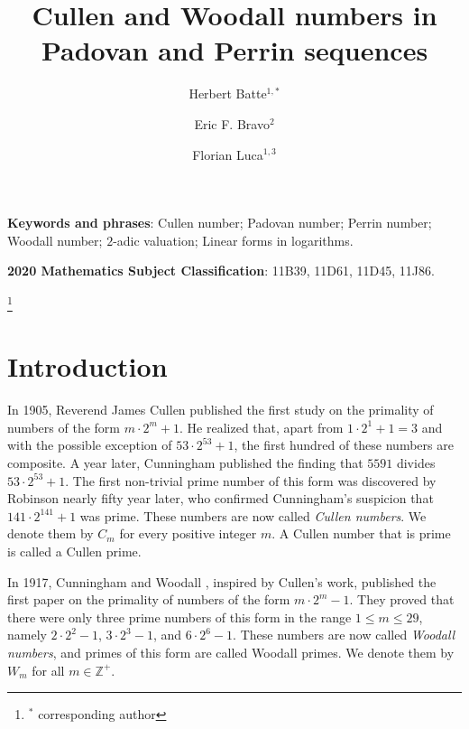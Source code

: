 \documentclass[11pt,a4paper]{article}
\title{Cullen and Woodall numbers in Padovan and Perrin sequences}
\author{Herbert Batte$^{1,*}$  \and Eric F. Bravo$^{2}$ \and Florian Luca$^{1,3}$ }
\date{}
\numberwithin{equation}{section}
\numberwithin{table}{section}
\numberwithin{figure}{section}
\begin{document}
\maketitle
{} 

\medskip

{\bf Keywords and phrases}: Cullen number; Padovan number; Perrin number;
Woodall number; $2$-adic valuation; Linear forms in logarithms.

\medskip

{\bf 2020 Mathematics Subject Classification}: 11B39, 11D61, 11D45, 11J86.

\medskip

\thanks{$ ^{*} $ corresponding author}

\section{Introduction}\label{intro}

In 1905, Reverend James Cullen \cite{JC} published the first study on the primality of numbers of the form $m \cdot 2^{m}+1$. He realized that, apart from $1\cdot 2^{1}+1=3$ and with the possible exception of $53\cdot 2^{53}+1$, the first hundred of these numbers are composite. A year later, Cunningham \cite{AC} published the finding that $5591$ divides $53\cdot 2^{53}+1$. The first non-trivial prime number of this form was discovered by Robinson \cite{RR} nearly fifty year later, who confirmed Cunningham's suspicion that $141\cdot 2^{141}+1$ was prime. These numbers are now called \textit{Cullen numbers}. We denote them by $C_m$ for every positive integer $m$. A Cullen number that is prime is called a Cullen prime.

In 1917, Cunningham and Woodall \cite{CW}, inspired by Cullen's work, published the first paper on the primality of numbers of the form $m\cdot 2^{m}-1$. They proved that there were only three prime numbers of this form in the range $1\le m\le 29$, namely $2\cdot 2^{2}-1$, $3\cdot 2^{3}-1$, and $6\cdot 2^{6}-1$. These numbers are now called \textit{Woodall numbers}, and primes of this form are called Woodall primes. We denote them by $W_m$ for all $m\in \mathbb{Z}^{+}$.
\end{document}
